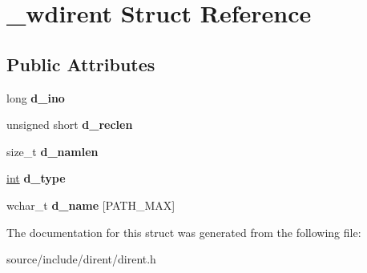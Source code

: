 \hypertarget{struct__wdirent}{}\section{\+\_\+wdirent Struct Reference}
\label{struct__wdirent}
\subsection*{Public Attributes}
\begin{DoxyCompactItemize}
\item 
\hypertarget{struct__wdirent_ac8cfaf294a0b6a49287d3f384c280c93}{}long {\bfseries d\+\_\+ino}\label{struct__wdirent_ac8cfaf294a0b6a49287d3f384c280c93}

\item 
\hypertarget{struct__wdirent_aff7f360608e576cd18cf11f2caf13ef3}{}unsigned short {\bfseries d\+\_\+reclen}\label{struct__wdirent_aff7f360608e576cd18cf11f2caf13ef3}

\item 
\hypertarget{struct__wdirent_a0050d6131e6fa90206903e216b38799e}{}size\+\_\+t {\bfseries d\+\_\+namlen}\label{struct__wdirent_a0050d6131e6fa90206903e216b38799e}

\item 
\hypertarget{struct__wdirent_a3c3874604ffccbeeaffd96709763cc3b}{}\hyperlink{_s_d_l__thread_8h_a6a64f9be4433e4de6e2f2f548cf3c08e}{int} {\bfseries d\+\_\+type}\label{struct__wdirent_a3c3874604ffccbeeaffd96709763cc3b}

\item 
\hypertarget{struct__wdirent_a267f915cd36cad5969337a9192cab567}{}wchar\+\_\+t {\bfseries d\+\_\+name} \mbox{[}P\+A\+T\+H\+\_\+\+M\+A\+X\mbox{]}\label{struct__wdirent_a267f915cd36cad5969337a9192cab567}

\end{DoxyCompactItemize}


The documentation for this struct was generated from the following file\+:\begin{DoxyCompactItemize}
\item 
source/include/dirent/dirent.\+h\end{DoxyCompactItemize}

